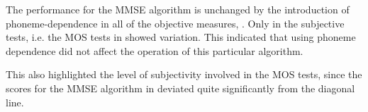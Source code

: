 The performance for the \ac{MMSE} algorithm is unchanged by the introduction
of phoneme-dependence in all of the objective measures, .
Only in the subjective tests, i.e. the \ac{MOS} tests in 
showed variation. This indicated that using phoneme dependence did
not affect the operation of this particular algorithm.

This also highlighted the level of subjectivity involved in the \ac{MOS}
tests, since the scores for the \ac{MMSE} algorithm in 
deviated quite significantly from the diagonal line.

